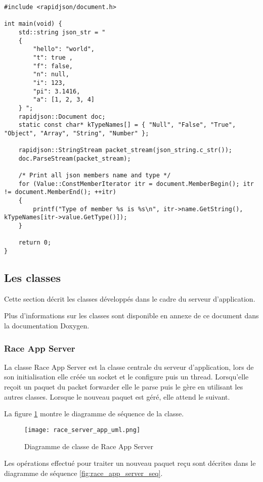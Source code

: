 \begin{lstlisting}[style=CStyle]
#include <rapidjson/document.h>

int main(void) {
	std::string json_str = "
	{
    	"hello": "world",
    	"t": true ,
    	"f": false,
    	"n": null,
    	"i": 123,
    	"pi": 3.1416,
    	"a": [1, 2, 3, 4]
	} ";
	rapidjson::Document doc;
	static const char* kTypeNames[] = { "Null", "False", "True", "Object", "Array", "String", "Number" };
	
	rapidjson::StringStream packet_stream(json_string.c_str());
	doc.ParseStream(packet_stream);
	
	/* Print all json members name and type */
	for (Value::ConstMemberIterator itr = document.MemberBegin(); itr != document.MemberEnd(); ++itr)
	{
    	printf("Type of member %s is %s\n", itr->name.GetString(), kTypeNames[itr->value.GetType()]);
	}

	return 0;
}
\end{lstlisting}

\subsection{Les classes}

Cette section décrit les classes développés dans le cadre du serveur d'application.

Plus d'informations sur les classes sont disponible en annexe de ce document dans la documentation Doxygen.

\subsubsection{Race App Server}

La classe Race App Server est la classe centrale du serveur d'application, lors de son initialisation elle créée un socket et le configure puis un thread. Lorsqu'elle reçoit un paquet du packet forwarder elle le parse puis le gère en utilisant les autres classes. Lorsque le nouveau paquet est géré, elle attend le suivant.

La figure \ref{fig:race_app_server_uml} montre le diagramme de séquence de la classe.

\begin{figure}[htb]
\centering 
\texttt{[image: race\_server\_app\_uml.png]} 
\caption{Diagramme de classe de Race App Server}
\label{fig:race_app_server_uml}
\end{figure}

Les opérations effectué pour traiter un nouveau paquet reçu sont décrites dans le diagramme de séquence \ref{fig:race_app_server_seq}.

